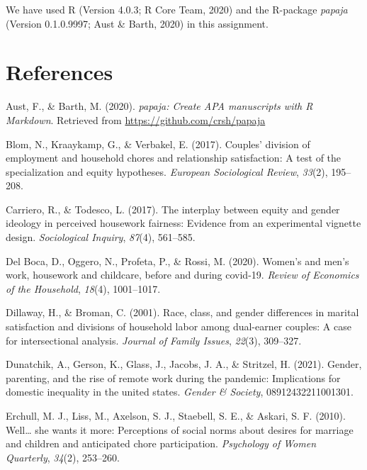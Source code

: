 \documentclass[
  english,
  man]{apa6}
\newlength{\cslhangindent}
\newenvironment{cslreferences}%
  {\setlength{\parindent}{0pt}%
  \everypar{\setlength{\hangindent}{\cslhangindent}}\ignorespaces}%
  {\par}
\begin{document}
We have used R (Version 4.0.3; R Core Team, 2020) and the R-package \emph{papaja} (Version 0.1.0.9997; Aust \& Barth, 2020) in this assignment.

\newpage

\hypertarget{references}{%
\section{References}\label{references}}

\begingroup
\setlength{\parindent}{-0.5in}
\setlength{\leftskip}{0.5in}

\hypertarget{refs}{}
\begin{cslreferences}
\leavevmode\hypertarget{ref-R-papaja}{}%
Aust, F., \& Barth, M. (2020). \emph{papaja: Create APA manuscripts with R Markdown}. Retrieved from \url{https://github.com/crsh/papaja}

\leavevmode\hypertarget{ref-blom2017couples}{}%
Blom, N., Kraaykamp, G., \& Verbakel, E. (2017). Couples' division of employment and household chores and relationship satisfaction: A test of the specialization and equity hypotheses. \emph{European Sociological Review}, \emph{33}(2), 195--208.

\leavevmode\hypertarget{ref-carriero2017interplay}{}%
Carriero, R., \& Todesco, L. (2017). The interplay between equity and gender ideology in perceived housework fairness: Evidence from an experimental vignette design. \emph{Sociological Inquiry}, \emph{87}(4), 561--585.

\leavevmode\hypertarget{ref-del2020women}{}%
Del Boca, D., Oggero, N., Profeta, P., \& Rossi, M. (2020). Women's and men's work, housework and childcare, before and during covid-19. \emph{Review of Economics of the Household}, \emph{18}(4), 1001--1017.

\leavevmode\hypertarget{ref-dillaway2001race}{}%
Dillaway, H., \& Broman, C. (2001). Race, class, and gender differences in marital satisfaction and divisions of household labor among dual-earner couples: A case for intersectional analysis. \emph{Journal of Family Issues}, \emph{22}(3), 309--327.

\leavevmode\hypertarget{ref-dunatchik2021gender}{}%
Dunatchik, A., Gerson, K., Glass, J., Jacobs, J. A., \& Stritzel, H. (2021). Gender, parenting, and the rise of remote work during the pandemic: Implications for domestic inequality in the united states. \emph{Gender \& Society}, 08912432211001301.

\leavevmode\hypertarget{ref-erchull2010well}{}%
Erchull, M. J., Liss, M., Axelson, S. J., Staebell, S. E., \& Askari, S. F. (2010). Well\ldots{} she wants it more: Perceptions of social norms about desires for marriage and children and anticipated chore participation. \emph{Psychology of Women Quarterly}, \emph{34}(2), 253--260.


\end{cslreferences}
\end{document}
